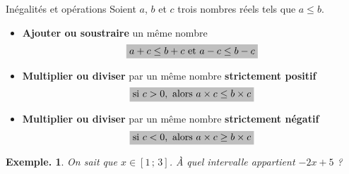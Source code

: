 \documentclass[12pt]{article}
\theoremstyle{break}
\newtheorem*{example}{Exemple.}
\begin{document}
\begin{proposition}{Inégalités et opérations}{}
  Soient $a$, $b$ et $c$ trois nombres réels tels que $a \leq b$.
  \begin{itemize}
    \item \textbf{Ajouter ou soustraire} un même nombre 
    $$\hideM{a + c \leq b + c \text{ et } a - c \leq b - c}$$
    \item \textbf{Multiplier ou diviser} par un même nombre \textbf{strictement positif} 
    $$\hideM{\text{si } c > 0, \text{ alors } a \times c \leq b \times c}$$
    \item \textbf{Multiplier ou diviser} par un même nombre \textbf{strictement négatif} 
    $$\hideM{\text{si } c < 0, \text{ alors } a \times c \geq b \times c}$$
  \end{itemize}
\end{proposition}

\begin{example}
  On sait que $x \in [1\,;\,3]$. À quel intervalle appartient $-2x + 5$ ?
  
  \vspace{0.2em}
\end{example}
\end{document}
